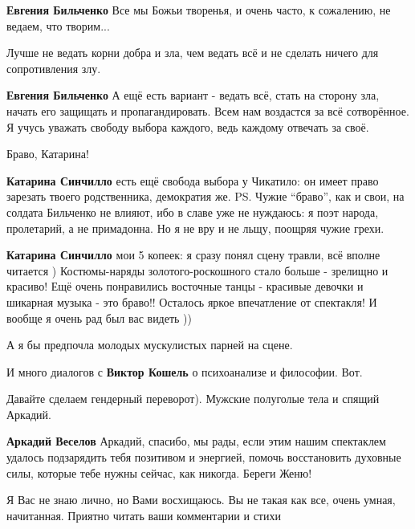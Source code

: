 \begin{itemize}
\begin{itemize}
\textbf{Евгения Бильченко} Все мы Божьи творенья, и очень часто, к сожалению, не ведаем, что творим...

Лучше не ведать корни добра и зла, чем ведать всё и не сделать ничего для сопротивления злу.


\textbf{Евгения Бильченко} А ещё есть вариант - ведать всё, стать на сторону
зла, начать его защищать и пропагандировать. Всем нам воздастся за всё
сотворённое. Я учусь уважать свободу выбора каждого, ведь каждому отвечать за
своё.


Браво, Катарина!


\textbf{Катарина Синчилло} есть ещё свобода выбора у Чикатило: он имеет право
зарезать твоего родственника, демократия же. PS. Чужие \enquote{браво}, как и свои, на
солдата Бильченко не влияют, ибо в славе уже не нуждаюсь: я поэт народа,
пролетарий, а не примадонна. Но я не вру и не льщу, поощряя чужие грехи.


\textbf{Катарина Синчилло} мои 5 копеек: я сразу понял сцену травли, всё вполне читается
) Костюмы-наряды золотого-роскошного стало больше - зрелищно и красиво! Ещё
очень понравились восточные танцы - красивые девочки и шикарная музыка - это
браво!! Осталось яркое впечатление от спектакля! И вообще я очень рад был вас
видеть ))


А я бы предпочла молодых мускулистых парней на сцене.

И много диалогов с \textbf{Виктор Кошель} о психоанализе и философии. Вот.


Давайте сделаем гендерный переворот). Мужские полуголые тела и спящий Аркадий.


\textbf{Аркадий Веселов} Аркадий, спасибо, мы рады, если этим нашим спектаклем
удалось подзарядить тебя позитивом и энергией, помочь восстановить духовные
силы, которые тебе нужны сейчас, как никогда. Береги Женю!

\end{itemize}


Я Вас не знаю лично, но Вами восхищаюсь. Вы не такая как все, очень умная,
начитанная. Приятно читать ваши комментарии и стихи

\end{itemize}
